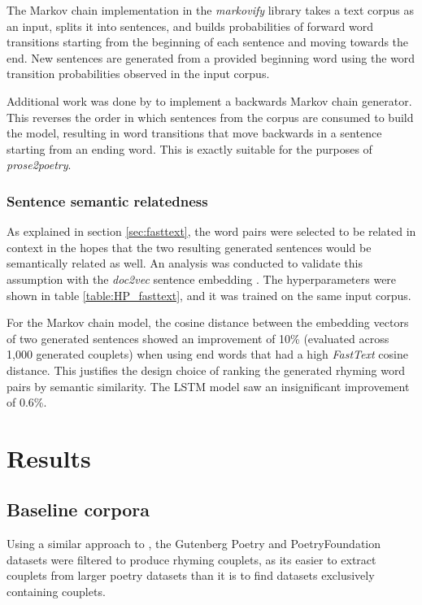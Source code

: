 \documentclass[11pt,a4paper]{article}
\begin{document}
The Markov chain implementation in the \textit{markovify} library takes a text corpus as an input, splits it into sentences, and builds probabilities of forward word transitions starting from the beginning of each sentence and moving towards the end. New sentences are generated from a provided beginning word using the word transition probabilities observed in the input corpus.

Additional work was done by \citet{markovifyfork} to implement a backwards Markov chain generator. This reverses the order in which sentences from the corpus are consumed to build the model, resulting in word transitions that move backwards in a sentence starting from an ending word. This is exactly suitable for the purposes of \textit{prose2poetry}.

\subsubsection{Sentence semantic relatedness}
\label{sec:doc2vec}
As explained in section \ref{sec:fasttext}, the word pairs were selected to be related in context in the hopes that the two resulting generated sentences would be semantically related as well. An analysis was conducted to validate this assumption with the \textit{doc2vec} sentence embedding \cite{docvec}. The hyperparameters were shown in table \ref{table:HP_fasttext}, and it was trained on the same input corpus.

For the Markov chain model, the cosine distance between the embedding vectors of two generated sentences showed an improvement of 10\% (evaluated across 1,000 generated couplets) when using end words that had a high \textit{FastText} cosine distance. This justifies the design choice of ranking the generated rhyming word pairs by semantic similarity. The LSTM model saw an insignificant improvement of 0.6\%.


\section{Results}
\label{sec:results}

\subsection{Baseline corpora}
\label{sec:corpora}

Using a similar approach to \citet{cole}, the Gutenberg Poetry \cite{gutenbergpoetry} and PoetryFoundation \cite{poetryfoundationkaggle} datasets were filtered to produce rhyming couplets, as its easier to extract couplets from larger poetry datasets than it is to find datasets exclusively containing couplets.
\end{document}
